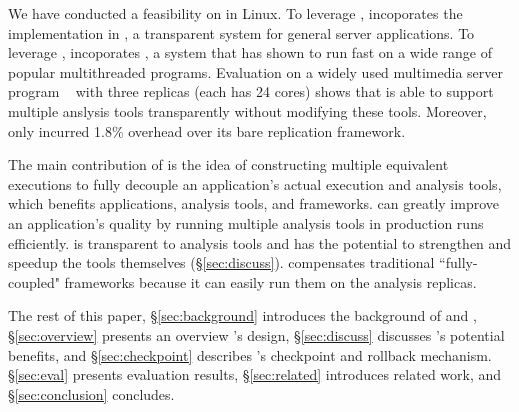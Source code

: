 We have conducted a feasibility on \xxx in Linux. To leverage \smr, \xxx 
incoporates the \paxos implementation in \repbox, a transparent \smr 
system for general server applications. To leverage \dmt, \xxx incoporates 
\parrot, a \dmt system that has shown to run fast on a wide range of 
popular multithreaded programs. Evaluation on a widely used multimedia server 
program \mediatomb~\cite{mediatomb} with three replicas (each has 24 cores) 
shows that \xxx is able to support multiple anslysis tools transparently 
without modifying these tools. Moreover, \xxx only incurred 1.8\% overhead over 
its bare replication framework.


The main contribution of \xxx is the idea of constructing multiple equivalent
executions to fully decouple an application's actual execution and analysis
tools, which benefits applications, analysis tools, and frameworks. \xxx can
greatly improve an application's quality by running multiple analysis tools in
production runs efficiently. \xxx is transparent to analysis tools and has the
potential to strengthen and speedup the tools themselves (\S\ref{sec:discuss}). 
\xxx compensates traditional ``fully-coupled" frameworks because it can easily 
run them on the analysis replicas.

The rest of this paper, \S\ref{sec:background} introduces the background of 
\smr and \dmt, \S\ref{sec:overview} presents an overview \xxx's design, 
\S\ref{sec:discuss} discusses \xxx's potential benefits, and 
\S\ref{sec:checkpoint} describes \xxx's checkpoint and rollback mechanism. 
\S\ref{sec:eval} presents evaluation results, \S\ref{sec:related} introduces 
related work, and \S\ref{sec:conclusion} concludes.